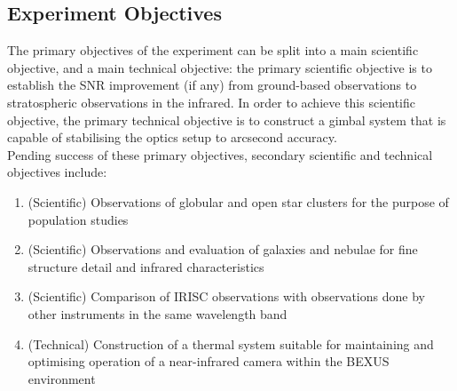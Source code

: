 \subsection{Experiment Objectives}

The primary objectives of the experiment can be split into a main scientific objective, and a main technical objective: the primary scientific objective is to establish the SNR improvement (if any) from ground-based observations to stratospheric observations in the infrared. In order to achieve this scientific objective, the primary technical objective is to construct a gimbal system that is capable of stabilising the optics setup to arcsecond accuracy.\\

Pending success of these primary objectives, secondary scientific and technical objectives include:
\renewcommand{\labelenumi}{\Roman{enumi}}
\begin{enumerate}
    \item (Scientific) Observations of globular and open star clusters for the purpose of population studies
    \item (Scientific) Observations and evaluation of galaxies and nebulae for fine structure detail and infrared characteristics
    \item (Scientific) Comparison of IRISC observations with observations done by other instruments in the same wavelength band
    \item (Technical) Construction of a thermal system suitable for maintaining and optimising operation of a near-infrared camera within the BEXUS environment
\end{enumerate}
